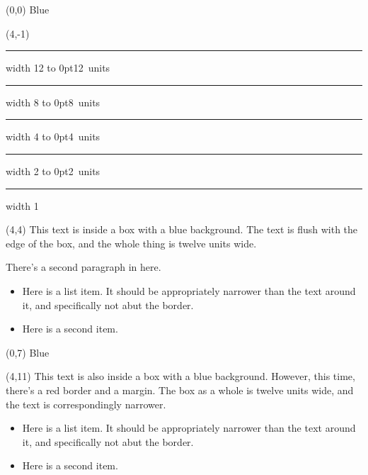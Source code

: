 \documentclass{article}
\begin{document}

\begin{textblock}{4}(0,0)
  Blue
\end{textblock}

\begin{textblock}{12}(4,-1)
  \hrule width 12\TPHorizModule
  \vbox to 0pt{\hbox{12 units}\vss}
  \TPVertModule
  \hrule width 8\TPHorizModule
  \vbox to 0pt{\hbox{8 units}\vss}
  \TPVertModule
  \hrule width 4\TPHorizModule
  \vbox to 0pt{\hbox{4 units}\vss}
  \TPVertModule
  \hrule width 2\TPHorizModule
  \vbox to 0pt{\hbox{2 units}\vss}
  \TPVertModule
  \hrule width 1\TPHorizModule
\end{textblock}

\begin{textblock}{12}(4,4)
  This text is inside a box with a blue background.  The text is flush
  with the edge of the box, and the whole thing is twelve units wide.

  There's a second paragraph in here.
  \begin{itemize}
  \item Here is a list item.  It should be appropriately narrower than
  the text around it, and specifically not abut the border.
  \item Here is a second item.
  \end{itemize}
\end{textblock}

\TPshowboxestrue
{}
\setlength\TPboxrulesize{0.25\TPHorizModule}

\TPMargin{1\TPHorizModule}

\begin{textblock}{4}(0,7)
  Blue
\end{textblock}

\begin{textblock}{12}(4,11)
  This text is also inside a box with a blue background.  However,
  this time, there's a red border and a margin.  The box as a whole is
  twelve units wide, and the text is correspondingly narrower.
  \begin{itemize}
  \item Here is a list item.  It should be appropriately narrower than
  the text around it, and specifically not abut the border.
  \item Here is a second item.
  \end{itemize}
\end{textblock}
\end{document}
